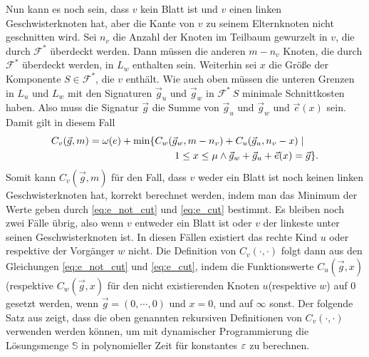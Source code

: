Nun kann es noch sein, dass $v$ kein Blatt ist und $v$ einen linken Geschwisterknoten hat, aber die Kante von $v$ zu seinem Elternknoten nicht geschnitten wird.
Sei $n_v$ die Anzahl der Knoten im Teilbaum gewurzelt in $v$, die durch $\mathcal{F}^*$ überdeckt werden.
Dann müssen die anderen $m - n_v$ Knoten, die durch $\mathcal{F}^*$ überdeckt werden, in $L_w$ enthalten sein.
Weiterhin sei $x$ die Größe der Komponente $S \in \mathcal{F}^*$, die $v$ enthält.
Wie auch oben müssen die unteren Grenzen in $L_u$ und $L_w$ mit den Signaturen $\vec{g}_u$ und $\vec{g}_w$ in $\mathcal{F}^* \ {S}$ minimale Schnittkosten haben.
Also muss die Signatur $\vec{g}$ die Summe von $\vec{g}_u$ und $\vec{g}_w$ und $\vec{e}(x)$ sein.
Damit gilt in diesem Fall
\begin{equation} \label{eq:e_cut}
    \begin{aligned}
        C_v(\vec{g}, m) = \omega(e) + \min \{ & C_w(\vec{g}_w, m - n_v) + C_u(\vec{g}_u, n_v - x) \mid \\ & \qquad 1 \leq x \leq \mu \land \vec{g}_w + \vec{g}_u + \vec{e}(x) = \vec{g} \}.
    \end{aligned}
\end{equation}
Somit kann $C_v(\vec{g}, m)$ für den Fall, dass $v$ weder ein Blatt ist noch keinen linken Geschwisterknoten hat, korrekt berechnet werden, indem man das Minimum der Werte geben durch \eqref{eq:e_not_cut} und \eqref{eq:e_cut} bestimmt.
Es bleiben noch zwei Fälle übrig, also wenn $v$ entweder ein Blatt ist oder $v$ der linkeste unter seinen Geschwisterknoten ist.
In diesen Fällen existiert das rechte Kind $u$ oder respektive der Vorgänger $w$ nicht.
Die Definition von $C_v(\cdot, \cdot)$ folgt dann aus den Gleichungen \eqref{eq:e_not_cut} und \eqref{eq:e_cut}, indem die Funktionswerte $C_u(\vec{g}, x)$(respektive $C_w(\vec{g}, x)$ für den nicht existierenden Knoten $u$(respektive $w$) auf $0$ gesetzt werden, wenn $\vec{g} = (0, \cdots, 0)$ und $x = 0$, und auf $\infty$ sonst. 
Der folgende Satz aus \parencite{ff13} zeigt, dass die oben genannten rekursiven Definitionen von $C_v(\cdot, \cdot)$ verwenden werden können, um mit dynamischer Programmierung die Lösungsmenge $\mathbb{S}$ in polynomieller Zeit für konstantes $\varepsilon$ zu berechnen. \\

